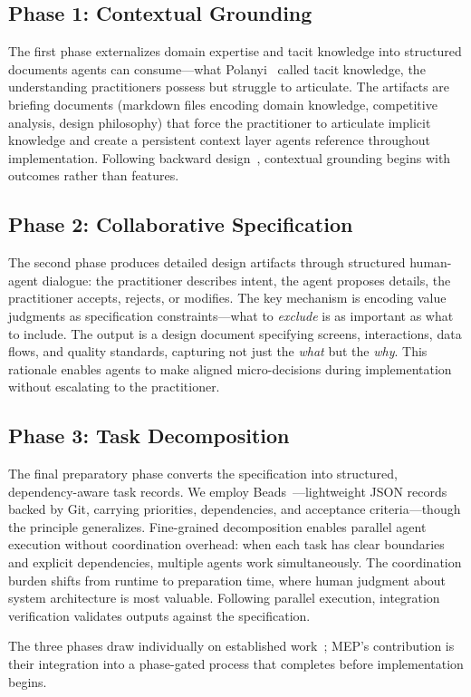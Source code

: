 \subsection{Phase 1: Contextual Grounding}

The first phase externalizes domain expertise and tacit knowledge
into structured documents agents can consume---what
Polanyi~\cite{polanyi1966tacit} called tacit knowledge,
the understanding practitioners possess but struggle to articulate.
The artifacts are briefing documents (markdown files encoding domain
knowledge, competitive analysis, design philosophy) that force the
practitioner to articulate implicit knowledge and create a
persistent context layer agents reference throughout implementation.
Following backward design~\cite{wiggins1998understanding},
contextual grounding begins with outcomes rather than features.

\subsection{Phase 2: Collaborative Specification}

The second phase produces detailed design artifacts through
structured human-agent dialogue: the practitioner describes intent,
the agent proposes details, the practitioner accepts, rejects, or
modifies. The key mechanism is encoding value judgments as
specification constraints---what to \emph{exclude} is as important
as what to include. The output is a design document specifying
screens, interactions, data flows, and quality standards, capturing
not just the \emph{what} but the \emph{why}. This rationale enables
agents to make aligned micro-decisions during implementation
without escalating to the practitioner.

\subsection{Phase 3: Task Decomposition}

The final preparatory phase converts the specification into
structured, dependency-aware task records. We employ
Beads~\cite{yegge2025beads, emanuel2025beadsrust}---lightweight JSON
records backed by Git, carrying priorities, dependencies, and
acceptance criteria---though the principle generalizes. Fine-grained
decomposition enables parallel agent execution without coordination
overhead: when each task has clear boundaries and explicit
dependencies, multiple agents work simultaneously. The coordination
burden shifts from runtime to preparation time, where human
judgment about system architecture is most valuable. Following
parallel execution, integration verification validates outputs
against the specification.

The three phases draw individually on established
work~\cite{polanyi1958personal, horthy2025rpi, huntley2025ralph};
MEP's contribution is their integration into a phase-gated process
that completes before implementation begins.
